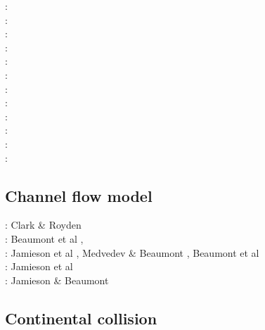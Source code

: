 \begin{scriptsize}
\nineteenseventyone: \cite{stbe71}\\
\nineteenninetyfive: \cite{fige95}\\
\twothousand: \cite{acgf00}\cite{trla00}\\
\twothousandone: \cite{masc01}\\
\twothousandeight: \cite{manc08}\cite{scsf08}\\
\twothousandeleven: \cite{frem11}\\
\twothousandthirteen: \cite{soma13}\cite{lehl13}\\
\twothousandfourteen: \cite{olbm14}\\
\twothousandfifteen: \cite{pevp15}\cite{jalr15}\\
\twothousandseventeen: \cite{naam17}\cite{scdu17}\\
\twothousandeighteen: \cite{naam18}\\
\twothousandnineteen: \cite{llor19}\cite{yada19}\cite{sogh19}
\end{scriptsize}

\subsection{Channel flow model} 

\begin{scriptsize}
\twothousand: Clark \& Royden \cite{clro00}\\
\twothousandfour: Beaumont et al \cite{bejn04}, \cite{jabm04}\\
\twothousandsix: Jamieson et al \cite{jabn06}, Medvedev \& Beaumont \cite{mebe06}, 
                 Beaumont et al \cite{benj06}\\
\twothousandseven: Jamieson et al \cite{jabn07}\\
\twothousandeleven: Jamieson \& Beaumont \cite{jabe11}
\end{scriptsize}

\subsection*{Continental collision} 


